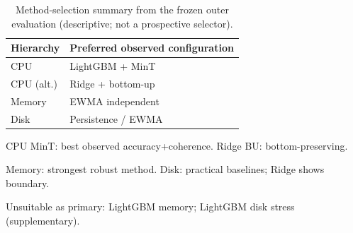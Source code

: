 \begin{table}[width=\columnwidth,pos=!ht]
\centering
\caption{Method-selection summary from the frozen outer evaluation (descriptive; not a prospective selector).}
\label{tab:method_selection}
\begin{threeparttable}
\small
\begin{tabularx}{\tblwidth}{@{}l>{\raggedright\arraybackslash}X@{}}
\toprule
Hierarchy & Preferred observed configuration \\
\midrule
CPU & LightGBM + MinT \\
CPU (alt.) & Ridge + bottom-up \\
Memory & EWMA independent \\
Disk & Persistence / EWMA \\
\bottomrule
\end{tabularx}
\begin{tablenotes}
\footnotesize
\item CPU MinT: best observed accuracy+coherence. Ridge BU: bottom-preserving.
\item Memory: strongest robust method. Disk: practical baselines; Ridge shows boundary.
\item Unsuitable as primary: LightGBM memory; LightGBM disk stress (supplementary).
\end{tablenotes}
\end{threeparttable}
\end{table}
